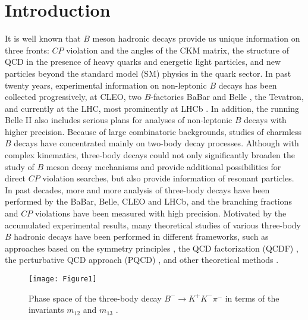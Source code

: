 \documentclass[11pt]{article}
\begin{document}
\section{Introduction}
It is well known that $B$ meson hadronic decays provide us unique information on three fronts: $CP$ violation and the angles of the CKM matrix, the structure of QCD in the presence of heavy quarks and energetic light particles, and new particles beyond the standard model (SM) physics in the quark sector. In past twenty years, experimental information on non-leptonic $B$ decays has been collected progressively, at CLEO, two $B$-factories BaBar and Belle \cite{BaBar:2014omp}, the Tevatron, and currently at the LHC, most prominently at LHCb \cite{Aaij:2019hzr}. In addition, the running  Belle II also includes serious plans for analyses of non-leptonic $B$ decays \cite{ Belle-II:2018jsg} with higher precision. Because of large combinatoric backgrounds, studies of charmless $B$ decays have concentrated mainly on two-body decay processes. Although with complex kinematics, three-body decays could not only significantly broaden the study of $B$ meson decay mechanisms and provide additional possibilities for direct $CP$ violation searches, but also provide information of resonant particles. In past decades, more and more analysis of three-body decays have been performed by the BaBar, Belle, CLEO and LHCb, and the branching fractions and $CP$ violations have been measured with high precision. Motivated by the accumulated experimental results, many theoretical studies of various three-body $B$ hadronic decays have been performed in different frameworks, such as approaches based on the symmetry principles \cite{Gronau:2005ax, Engelhard:2005hu, Imbeault:2011jz, Bhattacharya:2013boa, He:2014xha}, the QCD factorization (QCDF) \cite{ElBennich:2009da, Krankl:2015fha, Virto:2016fbw, Cheng:2002qu, Li:2014oca, Li:2014fla, Huber:2020pqb,Zhang:2013oqa, Wang:2015ula, Qi:2018syl, ElBennich:2006yi}, the perturbative QCD approach (PQCD) \cite{Chen:2002th, Wang:2014ira, Wang:2015uea, Li:2016tpn, Wang:2017hao, Rui:2017bgg, Zou:2020atb, Zou:2020ool, Yang:2021zcx}, and other theoretical methods \cite{Liang:2015qva, Ahmed:2020qkv,Shi:2021ste}.


\begin{figure}[!htb]
\begin{center}
\texttt{[image: Figure1]}
\caption{Phase space of the three-body decay $B^-\to K^+K^-\pi^-$ in terms of the invariants $m_{12}$ and $m_{13}$ \cite{Cheng:2016shb}.}
\label{DPs}
\end{center}
\end{figure}
\end{document}
